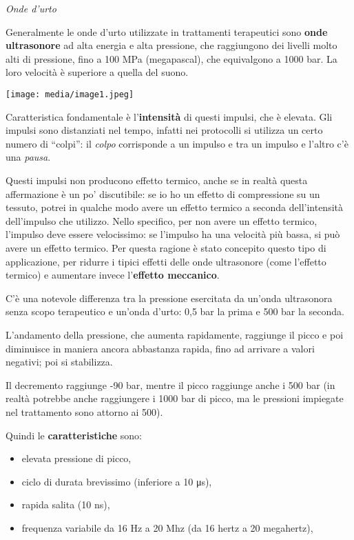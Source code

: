 \documentclass[]{article}
\date{}
\begin{document}
\emph{Onde d'urto}

Generalmente le onde d'urto utilizzate in trattamenti terapeutici sono
\textbf{onde ultrasonore} ad alta energia e alta pressione, che
raggiungono dei livelli molto alti di pressione, fino a 100 MPa
(megapascal), che equivalgono a 1000 bar. La loro velocità è superiore a
quella del suono.

\texttt{[image: media/image1.jpeg]}

Caratteristica fondamentale è l'\textbf{intensità} di questi impulsi,
che è elevata. Gli impulsi sono distanziati nel tempo, infatti nei
protocolli si utilizza un certo numero di ``colpi'': il \emph{colpo}
corrisponde a un impulso e tra un impulso e l'altro c'è una
\emph{pausa}.

Questi impulsi non producono effetto termico, anche se in realtà questa
affermazione è un po' discutibile: se io ho un effetto di compressione
su un tessuto, potrei in qualche modo avere un effetto termico a seconda
dell'intensità dell'impulso che utilizzo. Nello specifico, per non avere
un effetto termico, l'impulso deve essere velocissimo: se l'impulso ha
una velocità più bassa, si può avere un effetto termico. Per questa
ragione è stato concepito questo tipo di applicazione, per ridurre i
tipici effetti delle onde ultrasonore (come l'effetto termico) e
aumentare invece l'\textbf{effetto meccanico}.

C'è una notevole differenza tra la pressione esercitata da un'onda
ultrasonora senza scopo terapeutico e un'onda d'urto: 0,5 bar la prima e
500 bar la seconda.

L'andamento della pressione, che aumenta rapidamente, raggiunge il picco
e poi diminuisce in maniera ancora abbastanza rapida, fino ad arrivare a
valori negativi; poi si stabilizza.

Il decremento raggiunge -90 bar, mentre il picco raggiunge anche i 500
bar (in realtà potrebbe anche raggiungere i 1000 bar di picco, ma le
pressioni impiegate nel trattamento sono attorno ai 500).

Quindi le \textbf{caratteristiche} sono:

\begin{itemize}
\item
  elevata pressione di picco,
\item
  ciclo di durata brevissimo (inferiore a 10 μs),
\item
  rapida salita (10 ns),
\item
  frequenza variabile da 16 Hz a 20 Mhz (da 16 hertz a 20 megahertz),
\end{itemize}
\end{document}

